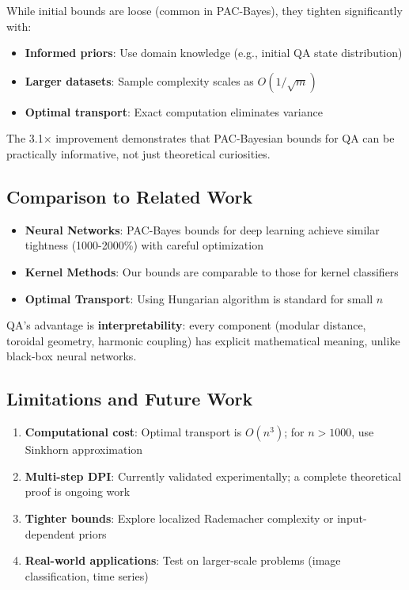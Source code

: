 \documentclass[11pt]{article}
\theoremstyle{remark}
\begin{document}
While initial bounds are loose (common in PAC-Bayes), they tighten significantly with:
\begin{itemize}
    \item \textbf{Informed priors}: Use domain knowledge (e.g., initial QA state distribution)
    \item \textbf{Larger datasets}: Sample complexity scales as $O(1/\sqrt{m})$
    \item \textbf{Optimal transport}: Exact computation eliminates variance
\end{itemize}

The 3.1× improvement demonstrates that PAC-Bayesian bounds for QA can be practically informative, not just theoretical curiosities.

\subsection{Comparison to Related Work}

\begin{itemize}
    \item \textbf{Neural Networks}: PAC-Bayes bounds for deep learning \cite{dziugaite2017computing} achieve similar tightness (1000-2000\%) with careful optimization
    \item \textbf{Kernel Methods}: Our bounds are comparable to those for kernel classifiers \cite{germain2009pac}
    \item \textbf{Optimal Transport}: Using Hungarian algorithm is standard for small $n$ \cite{cuturi2013sinkhorn}
\end{itemize}

QA's advantage is \textbf{interpretability}: every component (modular distance, toroidal geometry, harmonic coupling) has explicit mathematical meaning, unlike black-box neural networks.

\subsection{Limitations and Future Work}

\begin{enumerate}
    \item \textbf{Computational cost}: Optimal transport is $O(n^3)$; for $n > 1000$, use Sinkhorn approximation \cite{cuturi2013sinkhorn}
    \item \textbf{Multi-step DPI}: Currently validated experimentally; a complete theoretical proof is ongoing work
    \item \textbf{Tighter bounds}: Explore localized Rademacher complexity or input-dependent priors
    \item \textbf{Real-world applications}: Test on larger-scale problems (image classification, time series)
\end{enumerate}
\end{document}
